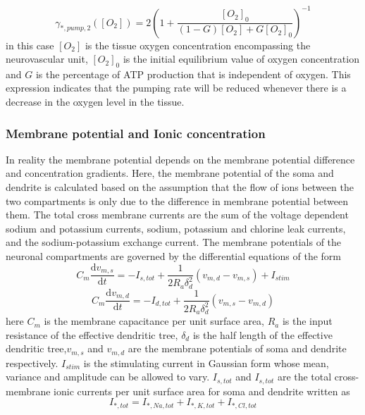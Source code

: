 \documentclass[fleqn]{report}
\numberwithin{equation}{section}
\numberwithin{equation}{section}
\begin{document}
				\begin{equation} \label{eq:Math_pump2}
				\gamma_{*,pump,2}([O_2])=2\left(1+\frac{[O_2]_0}{(1-G)[O_2]+G[O_2]_0}\right)^{-1}
				\end{equation}
				in this case $[O_2]$ is the tissue oxygen concentration encompassing the neurovascular unit, $[O_2]_0$ is the initial equilibrium value of oxygen concentration and $G$ is the percentage of ATP production that is independent of oxygen. This expression indicates that the pumping rate will be reduced whenever there is a decrease in the oxygen level in the tissue.
				
				
				
				\subsubsection{Membrane potential and Ionic concentration}
				In reality the membrane potential depends on the membrane potential difference and concentration gradients. Here, the membrane potential of the soma and dendrite is calculated based on the assumption that the flow of ions between the two compartments is only due to the difference in membrane potential between them. The total cross membrane currents are the sum of the voltage dependent sodium and potassium currents, sodium, potassium and chlorine leak currents, and the sodium-potassium exchange current. The membrane potentials of the neuronal compartments are governed by the differential equations of the form
				\begin{equation} %
				C_{m}\dfrac{\mathrm{d} v_{m,s}}{\mathrm{d} t} = -I_{s,tot}+\frac{1}{2R_a\delta_d^{2}}(v_{m,d}-v_{m,s})+I_{stim}
				\end{equation}
				\begin{equation} %
				C_{m}\dfrac{\mathrm{d} v_{m,d}}{\mathrm{d} t} = -I_{d,tot}+\frac{1}{2R_a\delta_d^{2}}(v_{m,s}-v_{m,d})
				\end{equation}
				here $C_m$ is the membrane capacitance per unit surface area, $R_a$ is the input resistance of the effective dendritic tree, $\delta_d$ is the half length of the effective dendritic tree,$v_{m,s}$ and $v_{m,d}$ are the membrane potentials of soma and dendrite respectively. $I_{stim}$ is the stimulating current in Gaussian form whose mean, variance and amplitude can be allowed to vary. $I_{s,tot}$ and $I_{s,tot}$ are the total cross-membrane ionic currents per unit surface area for soma and dendrite written as
				 \begin{equation} %
				I_{*,tot}=I_{*,Na,tot}+I_{*,K,tot}+I_{*,Cl,tot}
				\end{equation}
\end{document}
